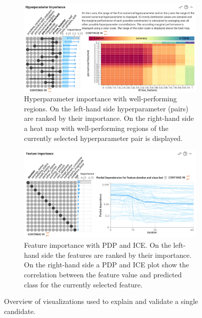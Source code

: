 \begin{figure}[htbp]
    \begin{subfigure}[t]{0.48\textwidth}
        \centering
        \includegraphics[width=\textwidth]{images/XAutoML e.png}
        \caption{Hyperparameter importance with well-performing regions. On the left-hand side hyperparameter (pairs) are ranked by their importance. On the right-hand side a heat map with well-performing regions of the currently selected hyperparameter pair is displayed.}
        \label{fig:hyperparameter_importance}
    \end{subfigure}
    \hfill
    \begin{subfigure}[t]{0.48\textwidth}
        \centering
        \includegraphics[width=\textwidth]{images/XAutoML f.png}
        \caption{Feature importance with PDP and ICE. On the left-hand side the features are ranked by their importance. On the right-hand side a PDP and ICE plot show the correlation between the feature value and predicted class for the currently selected feature.}
        \label{fig:feature_importance}
    \end{subfigure}
    
    \caption{Overview of visualizations used to explain and validate a single candidate.}
    \label{fig:xautoml_detailed_views}
\end{figure}

